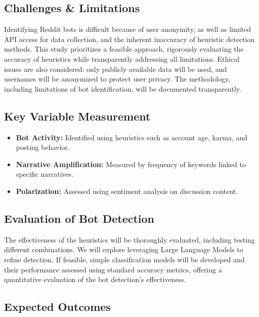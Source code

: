 \documentclass[
  letterpaper,
  DIV=11,
  numbers=noendperiod]{scrartcl}
\providecommand{\tightlist}{%
  \setlength{\itemsep}{0pt}\setlength{\parskip}{0pt}}\usepackage{longtable,booktabs,array}
\begin{document}
\subsection{Challenges \& Limitations}\label{challenges-limitations}

Identifying Reddit bots is difficult because of user anonymity, as well
as limited API access for data collection, and the inherent inaccuracy
of heuristic detection methods. This study prioritizes a feasible
approach, rigorously evaluating the accuracy of heuristics while
transparently addressing all limitations. Ethical issues are also
considered: only publicly available data will be used, and usernames
will be anonymized to protect user privacy. The methodology, including
limitations of bot identification, will be documented transparently.

\subsection{Key Variable Measurement}\label{key-variable-measurement}

\begin{itemize}
\tightlist
\item
  \textbf{Bot Activity:} Identified using heuristics such as account
  age, karma, and posting behavior.
\item
  \textbf{Narrative Amplification:} Measured by frequency of keywords
  linked to specific narratives.
\item
  \textbf{Polarization:} Assessed using sentiment analysis on discussion
  content.
\end{itemize}

\subsection{Evaluation of Bot
Detection}\label{evaluation-of-bot-detection}

The effectiveness of the heuristics will be thoroughly evaluated,
including testing different combinations. We will explore leveraging
Large Language Models to refine detection. If feasible, simple
classification models will be developed and their performance assessed
using standard accuracy metrics, offering a quantitative evaluation of
the bot detection's effectiveness.

\subsection{Expected Outcomes}\label{expected-outcomes}
\end{document}
